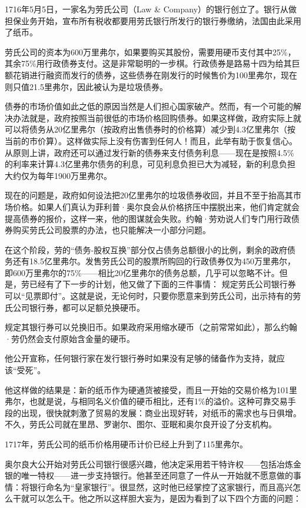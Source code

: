 \documentclass[12pt,oneside]{book}
\begin{document}
\begin{mdframed}
1716年5月5日，一家名为劳氏公司（Law \& Company）的银行创立了。银行从做担保业务开始，宣布所有税收都要用劳氏银行所发行的银行券缴纳，法国由此采用了纸币。

劳氏公司的资本为600万里弗尔，如果要购买其股份，需要用硬币支付其中25\%，其余75\%用行政债券支付。这是非常聪明的一步棋。行政债券是路易十四为给其巨额花销进行融资而发行的债券，这些债券在刚发行的时候售价为100里弗尔，现在则只值21.5里弗尔，因此被认为是垃圾债券。

债券的市场价值如此之低的原因当然是人们担心国家破产。然而，有一个可能的解决办法就是，政府按照当前很低的市场价格回购债券。如果这样做，政府实际上就可以将债务从20亿里弗尔（按政府出售债券时的价格算）减少到4.3亿里弗尔（按当前的市价算）。这样做实际上没有伤害到任何人！而且，此举有助于恢复信心。从原则上讲，政府还可以通过发行新的债券来支付债务利息——现在是按照4.5\%的利率来计算4.3亿里弗尔债务的利息，可见利息负担已大为减轻，新的利息负担大约仅为每年1900万里弗尔。

现在的问题是，政府如何设法把20亿里弗尔的垃圾债券收回，并且不至于抬高其市场价格。如果人们真认为菲利普·奥尔良会从价格挤压中摆脱出来，他们肯定就会提高债券的报价，这样一来，他的图谋就会失败。约翰·劳劝说人们专门用行政债券购买劳氏公司股票的办法，也只能解决一小部分问题。

在这个阶段，劳的“债务-股权互换”部分仅占债务总额很小的比例，剩余的政府债务还有18.5亿里弗尔。发售劳氏公司的股票所购回的行政债券仅为450万里弗尔，即600万里弗尔的75\%——相比20亿里弗尔的债务总额，几乎可以忽略不计。但是，劳已经有了下一步的计划，他又做了下面的三件事情：
规定劳氏公司银行券可以“见票即付”。这就是说，无论何时，只要你愿意来到劳氏公司，出示持有的劳氏公司银行券，都可以足额兑换硬币。

规定其银行券可以兑换旧币。如果政府采用缩水硬币（之前常常如此），那么约翰·劳仍然会支付原始含金量的硬币。

他公开宣称，任何银行家在发行银行券时如果没有足够的储备作为支持，就应该“受死”。

他这样做的结果是：新的纸币作为硬通货被接受，而且一开始的交易价格为101里弗尔，也就是说，与相同名义价值的硬币相比，还有1\%的溢价。这种可靠交易手段的出现，很快就刺激了贸易的发展：商业出现好转，对纸币的需求也与日俱增。不久，劳氏公司就在里昂、罗谢尔、图尔、亚眠和奥尔良开设了分支机构。

1717年，劳氏公司的纸币价格用硬币计价已经上升到了115里弗尔。

奥尔良大公开始对劳氏公司银行很感兴趣，他决定采用若干特许权——包括冶炼金银的唯一特权——进一步支持银行。他甚至还同意了一件从一开始就不愿意做的事情：将银行命名为“皇家银行”。很显然，这时他已经掌控了这家银行，而且高兴怎么干就可以怎么干。他之所以这样胆大妄为，是因为看到了以下四个方面的问题：


\end{mdframed}
\end{document}
